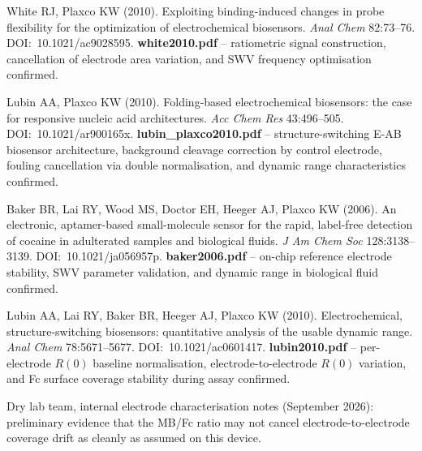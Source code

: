 \documentclass[10pt,a4paper]{article}
\numberwithin{equation}{section}
\begin{document}
\begin{enumerate}[label={[\arabic*]},noitemsep,leftmargin=*]

\item White RJ, Plaxco KW (2010). Exploiting binding-induced changes in
  probe flexibility for the optimization of electrochemical biosensors.
  \textit{Anal Chem} 82:73--76. DOI:~10.1021/ac9028595.
  \textbf{white2010.pdf} -- ratiometric signal construction, cancellation of
  electrode area variation, and SWV frequency optimisation confirmed.

\item Lubin AA, Plaxco KW (2010). Folding-based electrochemical biosensors:
  the case for responsive nucleic acid architectures. \textit{Acc Chem Res}
  43:496--505. DOI:~10.1021/ar900165x.
  \textbf{lubin\_plaxco2010.pdf} -- structure-switching E-AB biosensor
  architecture, background cleavage correction by control electrode, fouling
  cancellation via double normalisation, and dynamic range characteristics
  confirmed.

\item Baker BR, Lai RY, Wood MS, Doctor EH, Heeger AJ, Plaxco KW (2006).
  An electronic, aptamer-based small-molecule sensor for the rapid,
  label-free detection of cocaine in adulterated samples and biological
  fluids. \textit{J Am Chem Soc} 128:3138--3139. DOI:~10.1021/ja056957p.
  \textbf{baker2006.pdf} -- on-chip reference electrode stability, SWV
  parameter validation, and dynamic range in biological fluid confirmed.

\item Lubin AA, Lai RY, Baker BR, Heeger AJ, Plaxco KW (2010).
  Electrochemical, structure-switching biosensors: quantitative analysis
  of the usable dynamic range. \textit{Anal Chem} 78:5671--5677.
  DOI:~10.1021/ac0601417.
  \textbf{lubin2010.pdf} -- per-electrode $R(0)$ baseline normalisation,
  electrode-to-electrode $R(0)$ variation, and Fc surface coverage stability
  during assay confirmed.

\item Dry lab team, internal electrode characterisation notes (September
  2026): preliminary evidence that the MB/Fc ratio may not cancel
  electrode-to-electrode coverage drift as cleanly as assumed on this
  device.

\end{enumerate}
\end{document}

